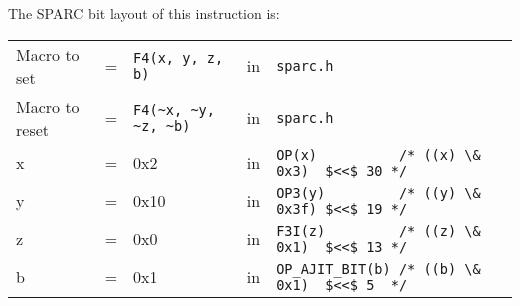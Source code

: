 \begin{enumerate}
  The SPARC bit layout of this instruction is:

  \begin{tabular}[h]{lclcl}
    Macro to set   &=&  \verb|F4(x, y, z, b)|     &in& \verb|sparc.h|     \\
    Macro to reset &=&  \verb|F4(~x, ~y, ~z, ~b)| &in& \verb|sparc.h|     \\
    x &=& 0x2      &in& \verb|OP(x)          /* ((x) \& 0x3)  $<<$ 30 */| \\
    y &=& 0x10     &in& \verb|OP3(y)         /* ((y) \& 0x3f) $<<$ 19 */| \\
    z &=& 0x0      &in& \verb|F3I(z)         /* ((z) \& 0x1)  $<<$ 13 */| \\
    b &=& 0x1      &in& \verb|OP_AJIT_BIT(b) /* ((b) \& 0x1)  $<<$ 5  */|
  \end{tabular}


\end{enumerate}
